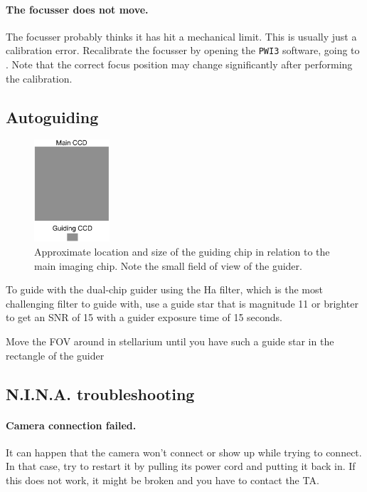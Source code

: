 \documentclass[a4paper, 11pt, fleqn]{memoir}
\begin{document}
\paragraph*{The focusser does not move.}
The focusser probably thinks it has hit a mechanical limit.
This is usually just a calibration error.
Recalibrate the focusser by opening the \texttt{PWI3} software, going to .
Note that the correct focus position may change significantly after performing the calibration.

\subsection{Autoguiding}

\begin{figure}
    \centering
    \includegraphics[width=0.25\textwidth]{guiding-chip-position}
    \caption{Approximate location and size of the guiding chip in relation to the main imaging chip.
        Note the small field of view of the guider.
    }
    \label{finder}
\end{figure}



To guide with the dual-chip guider using the Ha filter, which is the most challenging filter to guide with, use a guide star that is magnitude 11 or brighter to get an SNR of 15 with a guider exposure time of 15 seconds.

Move the FOV around in stellarium until you have such a guide star in the rectangle of the guider


\subsection{N.I.N.A. troubleshooting}

\paragraph*{Camera connection failed.} It can happen that the camera won't connect or show up while trying to connect. In that case, try to restart it by pulling its power cord and putting it back in. If this does not work, it might be broken and you have to contact the TA.
\end{document}
